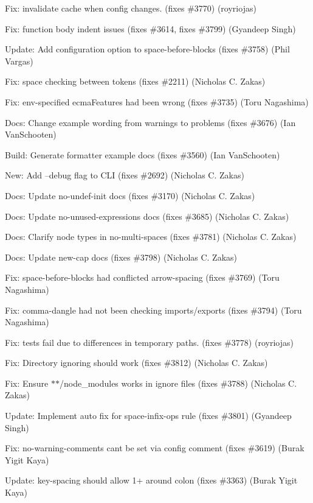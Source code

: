 \begin{DoxyItemize}
\item Fix\+: invalidate cache when config changes. (fixes \#3770) (royriojas)
\item Fix\+: function body indent issues (fixes \#3614, fixes \#3799) (Gyandeep Singh)
\item Update\+: Add configuration option to {\ttfamily space-\/before-\/blocks} (fixes \#3758) (Phil Vargas)
\item Fix\+: space checking between tokens (fixes \#2211) (Nicholas C. Zakas)
\item Fix\+: env-\/specified ecma\+Features had been wrong (fixes \#3735) (Toru Nagashima)
\item Docs\+: Change example wording from warnings to problems (fixes \#3676) (Ian Van\+Schooten)
\item Build\+: Generate formatter example docs (fixes \#3560) (Ian Van\+Schooten)
\item New\+: Add --debug flag to C\+LI (fixes \#2692) (Nicholas C. Zakas)
\item Docs\+: Update no-\/undef-\/init docs (fixes \#3170) (Nicholas C. Zakas)
\item Docs\+: Update no-\/unused-\/expressions docs (fixes \#3685) (Nicholas C. Zakas)
\item Docs\+: Clarify node types in no-\/multi-\/spaces (fixes \#3781) (Nicholas C. Zakas)
\item Docs\+: Update new-\/cap docs (fixes \#3798) (Nicholas C. Zakas)
\item Fix\+: {\ttfamily space-\/before-\/blocks} had conflicted {\ttfamily arrow-\/spacing} (fixes \#3769) (Toru Nagashima)
\item Fix\+: {\ttfamily comma-\/dangle} had not been checking imports/exports (fixes \#3794) (Toru Nagashima)
\item Fix\+: tests fail due to differences in temporary paths. (fixes \#3778) (royriojas)
\item Fix\+: Directory ignoring should work (fixes \#3812) (Nicholas C. Zakas)
\item Fix\+: Ensure $\ast$$\ast$/node\+\_\+modules works in ignore files (fixes \#3788) (Nicholas C. Zakas)
\item Update\+: Implement auto fix for {\ttfamily space-\/infix-\/ops} rule (fixes \#3801) (Gyandeep Singh)
\item Fix\+: {\ttfamily no-\/warning-\/comments} can\textquotesingle{}t be set via config comment (fixes \#3619) (Burak Yigit Kaya)
\item Update\+: {\ttfamily key-\/spacing} should allow 1+ around colon (fixes \#3363) (Burak Yigit Kaya)
$$
\end{DoxyItemize}
